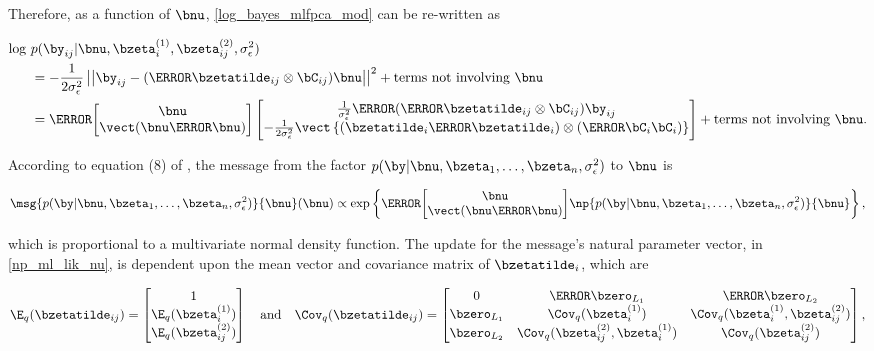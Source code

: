 \documentclass[12pt]{article}
\theoremstyle{plain}
\theoremstyle{definition}
\theoremstyle{remark}
\def\sigsqeps{\sigma^2_{\epsilon}}
\newcommand\bzetaL[2]{\bzeta^{(#1)}_{#2}}
\newcommand\tni[1]{\text{terms not involving $#1$}}
\begin{document}
\noindent Therefore, as a function of $\bnu$, \eqref{log_bayes_mlfpca_mod} can be re-written as

\begin{align*}
	\log \ &p (\by_{ij} | \bnu, \bzetaL{1}{i}, \bzetaL{2}{ij}, \sigsqeps) \\
		& = -\frac{1}{2\sigsqeps} \left|\left|
			\by_{ij} - (\T{\bzetatilde_{ij}} \otimes \bC_{ij}) \bnu
		\right|\right|^2 + \tni{\bnu} \\
		& = \T{\begin{bmatrix}
			\bnu \\
			\vect (\bnu \T{\bnu})
		\end{bmatrix}} \begin{bmatrix}
			\frac{1}{\sigsqeps} \T{(\T{\bzetatilde_{ij}} \otimes \bC_{ij})} \by_{ij} \\
			-\frac{1}{2\sigsqeps} \vect \left\{
				(\bzetatilde_i \T{\bzetatilde_i}) \otimes (\T{\bC_i} \bC_i)
			\right\}
		\end{bmatrix} + \tni{\bnu}.
\end{align*}

\noindent According to equation (8) of \citet{wand17}, the message from the factor $p (\by | \bnu,
\bzeta_1, \dots, \bzeta_n, \sigsqeps)$ to $\bnu$ is 

\[
	\msg{p (\by | \bnu, \bzeta_1, \dots, \bzeta_n, \sigsqeps)}{\bnu} (\bnu) \propto
		\exp \left\{
			\T{\begin{bmatrix}
				\bnu \\
				\vect (\bnu \T{\bnu})
			\end{bmatrix}}
			\np{p (\by | \bnu, \bzeta_1, \dots, \bzeta_n, \sigsqeps)}{\bnu}
		\right\},
\]


\noindent which is proportional to a
multivariate normal density function. The update for the message's natural parameter vector,
in \eqref{np_ml_lik_nu}, is dependent upon
the mean vector and covariance matrix of $\bzetatilde_i$, which are

\begin{equation}
	\E_q (\bzetatilde_{ij}) = \begin{bmatrix}
		1 \\
		\E_q (\bzetaL{1}{i}) \\
		\E_q (\bzetaL{2}{ij})
	\end{bmatrix} \quad
	\text{and} \quad
	\Cov_q (\bzetatilde_{ij}) = \begin{bmatrix}
		0 & \T{\bzero_{L_1}} & \T{\bzero_{L_2}} \\
		\bzero_{L_1} & \Cov_q (\bzetaL{1}{i}) & \Cov_q (\bzetaL{1}{i}, \bzetaL{2}{ij}) \\
		\bzero_{L_2} & \Cov_q (\bzetaL{2}{ij}, \bzetaL{1}{i}) & \Cov_q (\bzetaL{2}{ij})
	\end{bmatrix},
\label{exp_ml_lik_zeta_tilde}
\end{equation}
\end{document}
